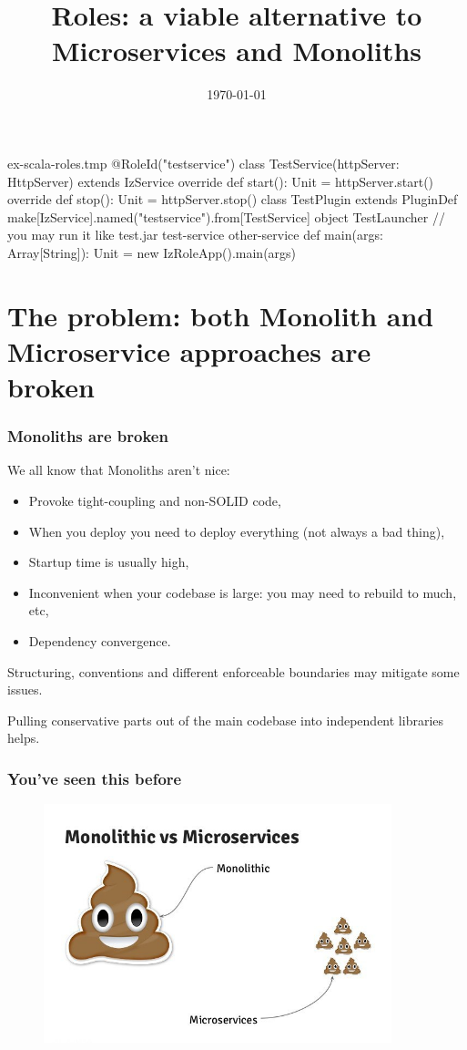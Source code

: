 \documentclass[usenames,dvipsnames]{beamer}
\title[Roles]{Roles: a viable alternative to Microservices and Monoliths}
\institute[Septimal Mind Ltd]
    {
    Septimal Mind Ltd\\
    \medskip
    \textit{team@7mind.io}
    }
\date{\today}
\begin{document}
\begin{VerbatimOut}{ex-scala-roles.tmp}
@RoleId("testservice")
class TestService(httpServer: HttpServer) extends IzService {
  override def start(): Unit = httpServer.start()
  override def stop(): Unit = httpServer.stop()
}
class TestPlugin extends PluginDef {
  make[IzService].named("testservice").from[TestService]
}
object TestLauncher {
  // you may run it like test.jar test-service other-service
  def main(args: Array[String]): Unit = {
    new IzRoleApp().main(args)
  }
}
\end{VerbatimOut}

\begin{frame}
\titlepage
\end{frame}

\section{The problem: both Monolith and Microservice approaches are broken}

\begin{frame}
\frametitle{Monoliths are broken}
We all know that Monoliths aren't nice:
\begin{itemize}
\item Provoke tight-coupling and non-SOLID code,
\item When you deploy you need to deploy everything (not always a bad thing),
\item Startup time is usually high,
\item Inconvenient when your codebase is large: you may need to rebuild to much, etc,
\item Dependency convergence.
\end{itemize}

Structuring, conventions and different enforceable boundaries may mitigate some issues.

Pulling conservative parts out of the main codebase into independent libraries helps.
\end{frame}

\begin{frame}
\frametitle{You've seen this before}
\begin{figure}
    \includegraphics[width=0.9\textwidth]{media/mono-ms-joke.jpg}
\end{figure}
\end{frame}
\end{document}
